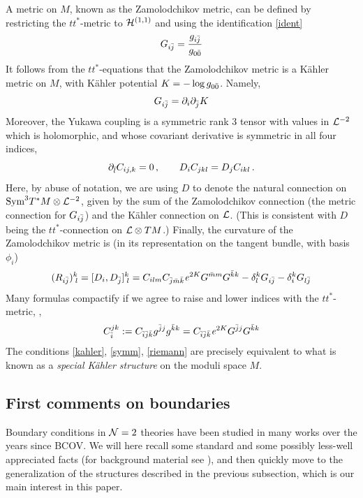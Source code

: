 A metric on $M$, known as the Zamolodchikov metric, can be defined by
restricting the $tt^*$-metric to ${\cal H}^{(1,1)}$ and using the identification
\eqref{ident}
\begin{equation}
G_{i\jb} = \frac{g_{i\jb}}{g_{0\0b}}
\end{equation}
It follows from the $tt^*$-equations that the Zamolodchikov metric is a 
K\"ahler metric on $M$, with K\"ahler potential $K=-\log g_{0\0b}$.
Namely,
\begin{equation}
\eqlabel{kahler}
G_{i\jb} = \del_i\del_\jb K
\end{equation}
Moreover, the Yukawa coupling is a symmetric rank 3 tensor with values in 
${\cal L}^{-2}$ which is holomorphic, and whose covariant derivative is symmetric 
in all four indices,
\begin{equation}
\eqlabel{symm}
\del_\lb C_{ij,k} = 0 \,,\qquad D_{i}C_{jkl} = D_j C_{ikl}\,.
\end{equation}
Here, by abuse of notation, we are using $D$ to denote the natural connection 
on ${\rm Sym}^3T^*M\otimes{\cal L}^{-2}$, given by the sum of the Zamolodchikov 
connection (the metric connection for $G_{i{\bar j}}$) and the K\"ahler connection 
on ${\cal L}$. (This is consistent with $D$ being the $tt^*$-connection on 
${\cal L}\otimes TM$.) Finally, the curvature of the Zamolodchikov metric is 
(in its representation on the tangent bundle, with basis $\phi_i$)
\begin{equation}
\eqlabel{riemann}
(R_{i\jb})^k_{\;l} = [D_i,D_\jb]^k_{\;l} = C_{ilm} C_{\jb\mb\kb} \ee^{2K}
G^{\mb m} G^{\kb k} - \delta_l^k G_{i\jb} - \delta_i^k G_{l\jb}
\end{equation}
Many formulas compactify if we agree to raise and lower indices with
the $tt^*$-metric, \eg, 
\begin{equation}
C_{\bar i}^{jk}:=C_{{\bar i}{\bar j}{\bar k}} g^{{\bar j} j}g^{{\bar k} k}
= C_{{\bar i}{\bar j}{\bar k}}{\it e}^{2K} G^{{\bar j} j}G^{{\bar k} k}
\end{equation}
The conditions \eqref{kahler}, \eqref{symm}, \eqref{riemann} are precisely 
equivalent to what is known as a {\it special K\"ahler structure} on the 
moduli space $M$. 


\subsection{First comments on boundaries}
\label{first}

Boundary conditions in ${\cal N}=2$ theories have been studied in many works
over the years since BCOV. We will here recall some standard and some 
possibly less-well appreciated facts (for background material see 
\cite{horietal}), and then quickly move to the generalization of the 
structures described in the previous subsection, which is our main 
interest in this paper.

